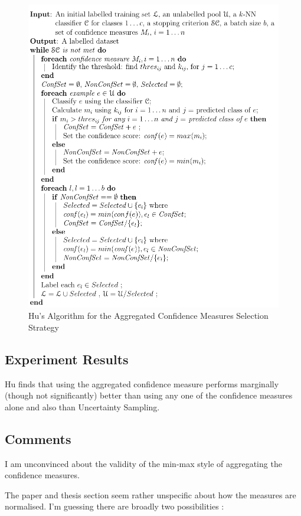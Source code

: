 \documentclass[a4paper,11pt]{report}
\begin{document}
\begin{figure}[h!]
\includegraphics{./Others/Hu2011AggregrateAlgorithm}
\caption{Hu's Algorithm for the Aggregated Confidence Measures Selection Strategy}
\end{figure}

\subsection{Experiment Results}
Hu finds that using the aggregated confidence measure performs marginally (though not significantly) better than using any one of the confidence measures alone and also than Uncertainty Sampling.


\subsection{Comments}
I am unconvinced about the validity of the min-max style of aggregating the confidence measures.

The paper and thesis section seem rather unspecific about how the measures are normalised. I'm guessing there are broadly two possibilities :
\end{document}
